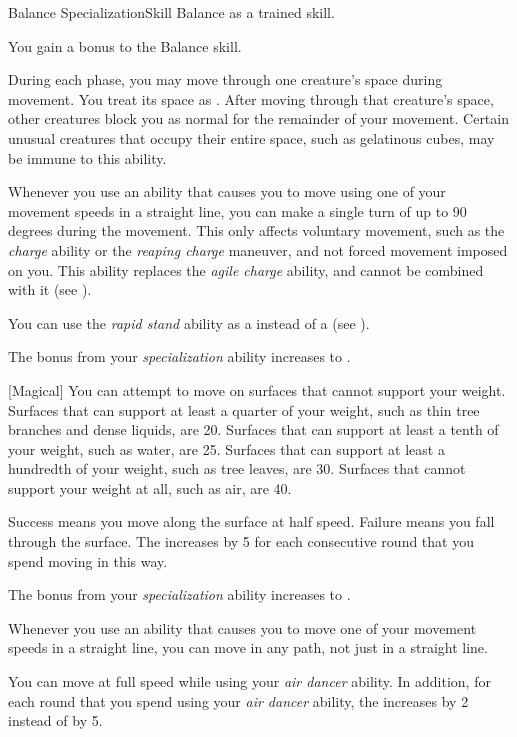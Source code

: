     \begin{feat}{Balance Specialization}{Skill}
        \featpre Balance as a trained skill.

         You gain a  bonus to the Balance skill.

         During each phase, you may move through one creature's space during movement.
        You treat its space as .
        After moving through that creature's space, other creatures block you as normal for the remainder of your movement.
        Certain unusual creatures that occupy their entire space, such as gelatinous cubes, may be immune to this ability.

         Whenever you use an ability that causes you to move using one of your movement speeds in a straight line, you can make a single turn of up to 90 degrees during the movement. 
        This only affects voluntary movement, such as the \textit{charge} ability or the \textit{reaping charge} maneuver, and not forced movement imposed on you.
        This ability replaces the \textit{agile charge} ability, and cannot be combined with it (see ).

         You can use the \textit{rapid stand} ability as a  instead of a  (see ).

         The bonus from your \textit{specialization} ability increases to .

        [Magical] You can attempt to move on surfaces that cannot support your weight.
        Surfaces that can support at least a quarter of your weight, such as thin tree branches and dense liquids, are  20.
        Surfaces that can support at least a tenth of your weight, such as water, are  25.
        Surfaces that can support at least a hundredth of your weight, such as tree leaves, are  30.
        Surfaces that cannot support your weight at all, such as air, are  40.

        Success means you move along the surface at half speed.
        Failure means you fall through the surface.
        The  increases by 5 for each consecutive round that you spend moving in this way.

         The bonus from your \textit{specialization} ability increases to .

         Whenever you use an ability that causes you to move one of your movement speeds in a straight line, you can move in any path, not just in a straight line.

         You can move at full speed while using your \textit{air dancer} ability.
        In addition, for each round that you spend using your \textit{air dancer} ability, the  increases by 2 instead of by 5.
    \end{feat}

